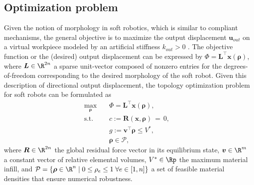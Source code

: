 \subsection{Optimization problem}
Given the notion of morphology in soft robotics, which is similar to compliant mechanisms, the general objective is to maximize the output displacement $\boldsymbol{u}_{out}$ on a virtual workpiece modeled by an artificial stiffness $k_{out} > 0$ \cite{Sigmund2015, Gain2013}. The objective function or the (desired) output displacement can be expressed by $\Phi = \boldsymbol{L}^\top\boldsymbol{x}(\boldsymbol{\rho})$, where $\boldsymbol{L} \in \R^{2n}$ a sparse unit-vector composed of nonzero entries for the degrees-of-freedom corresponding to the desired morphology of the soft robot. Given this description of directional output displacement, the topology optimization problem for soft robots can be formulated as
\begin{equation}
\begin{aligned}
\max_{\boldsymbol{\rho}} \quad &  \Phi = \boldsymbol{L}^\top \boldsymbol{x}(\boldsymbol{\rho}), \\
\textrm{s.t.} \quad & c:=\boldsymbol{R}(\boldsymbol{x},\boldsymbol{\rho}) \,= \,0,\\
& g:=\boldsymbol{v}^\top \boldsymbol{\rho}  \le V^*, \\
  &\boldsymbol{\rho} \in \mathcal{P},
  \label{eq:opt}
\end{aligned}
\end{equation}
where $\boldsymbol{R} \in \R^{2n}$ the global residual force vector in its equilibrium state, $\boldsymbol{v} \in \R^{m}$ a constant vector of relative elemental volumes, $V^* \in \Rp$ the maximum material infill, and $\mathcal{P} = \{\boldsymbol{\rho} \in \R^n \; | \; 0  \le \rho_e \le 1 \; \forall e \in [1,n] \}$ a set of feasible material densities that ensure numerical robustness.

